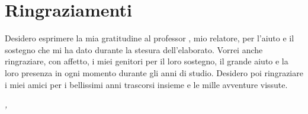 \begingroup
\let\clearpage\relax
\let\cleardoublepage\relax
\let\cleardoublepage\relax

\chapter*{Ringraziamenti}
\noindent Desidero esprimere la mia gratitudine al professor \myProf, mio relatore, per l'aiuto e il sostegno che mi ha dato durante la stesura dell'elaborato.
\noindent Vorrei anche ringraziare, con affetto, i miei genitori per il loro sostegno, il grande aiuto e la loro presenza in ogni momento durante gli anni di studio.
\noindent Desidero poi ringraziare i miei amici per i bellissimi anni trascorsi insieme e le mille avventure vissute.
\bigskip

\noindent\textit{\myLocation, \myTime}
\hfill \myName

\endgroup
